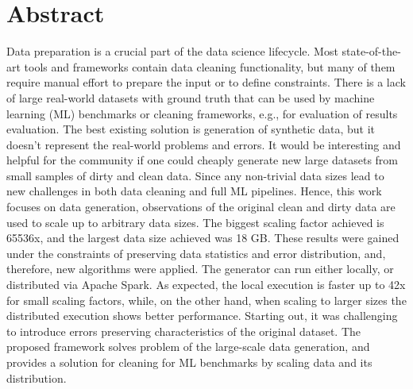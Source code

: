 \chapter*{Abstract}

Data preparation is a crucial part of the data science lifecycle.
Most state-of-the-art tools and frameworks contain data cleaning functionality, 
but many of them require manual effort to prepare the input or to define constraints.
There is a lack of large real-world datasets with ground truth that can be used by machine learning (ML) benchmarks or cleaning frameworks, e.g., for evaluation of results evaluation.
The best existing solution is generation of synthetic data, but it doesn't represent the real-world problems and errors.
It would be interesting and helpful for the community if one could cheaply generate new large datasets from small samples of dirty and clean data.
Since any non-trivial data sizes lead to new challenges in both data cleaning and full ML pipelines.
Hence, this work focuses on data generation, observations of the original clean and dirty data are used to scale up to arbitrary data sizes.
The biggest scaling factor achieved is 65536x, and the largest data size achieved was 18 GB.
These results were gained under the constraints of preserving data statistics and error distribution, and, therefore, new algorithms were applied.
The generator can run either locally, or distributed via Apache Spark.
As expected, the local execution is faster up to 42x for small scaling factors, 
while, on the other hand, when scaling to larger sizes the distributed execution shows better performance.  %
Starting out, it was challenging to introduce errors preserving characteristics of the original dataset. 
The proposed framework solves problem of the large-scale data generation, and provides a solution for cleaning for ML benchmarks by scaling data and its distribution.


\newpage\null\thispagestyle{empty}\newpage
